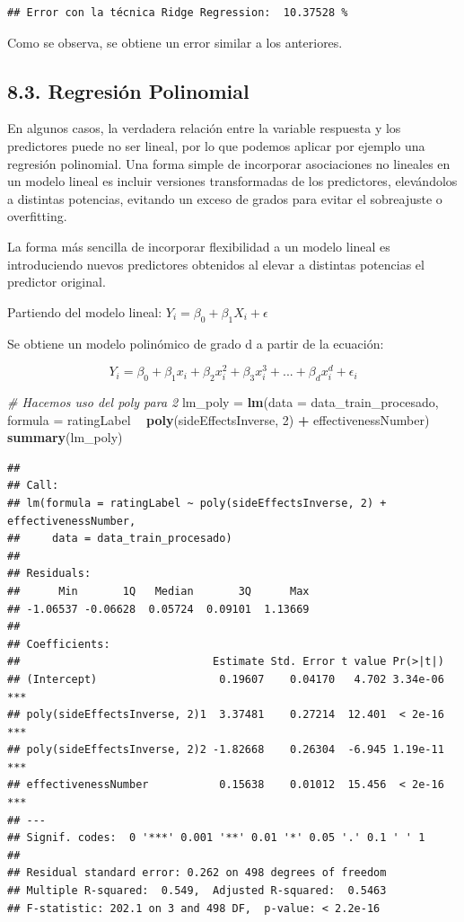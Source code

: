 \documentclass[spanish,]{article}
\newenvironment{Shaded}{\begin{snugshade}}{\end{snugshade}}
\newcommand{\KeywordTok}[1]{\textcolor[rgb]{0.13,0.29,0.53}{\textbf{#1}}}
\newcommand{\DataTypeTok}[1]{\textcolor[rgb]{0.13,0.29,0.53}{#1}}
\newcommand{\DecValTok}[1]{\textcolor[rgb]{0.00,0.00,0.81}{#1}}
\newcommand{\StringTok}[1]{\textcolor[rgb]{0.31,0.60,0.02}{#1}}
\newcommand{\CommentTok}[1]{\textcolor[rgb]{0.56,0.35,0.01}{\textit{#1}}}
\newcommand{\OperatorTok}[1]{\textcolor[rgb]{0.81,0.36,0.00}{\textbf{#1}}}
\newcommand{\NormalTok}[1]{#1}
\begin{document}
\begin{verbatim}
## Error con la técnica Ridge Regression:  10.37528 %
\end{verbatim}

Como se observa, se obtiene un error similar a los anteriores.

\subsection{8.3. Regresión Polinomial}\label{regresion-polinomial}

En algunos casos, la verdadera relación entre la variable respuesta y
los predictores puede no ser lineal, por lo que podemos aplicar por
ejemplo una regresión polinomial. Una forma simple de incorporar
asociaciones no lineales en un modelo lineal es incluir versiones
transformadas de los predictores, elevándolos a distintas potencias,
evitando un exceso de grados para evitar el sobreajuste o overfitting.

La forma más sencilla de incorporar flexibilidad a un modelo lineal es
introduciendo nuevos predictores obtenidos al elevar a distintas
potencias el predictor original.

Partiendo del modelo lineal: \(Y_i = \beta_0 + \beta_1 X_i + \epsilon\)

Se obtiene un modelo polinómico de grado d a partir de la ecuación:

\[Y_i = \beta_0 + \beta_1 x_i + \beta_2 x^2_i + \beta_3 x^3_i + ... + \beta_d x^d_i + \epsilon_i\]

\begin{Shaded}
\begin{Highlighting}[]
\CommentTok{# Hacemos uso del poly para 2}
\NormalTok{lm_poly =}\StringTok{ }\KeywordTok{lm}\NormalTok{(}\DataTypeTok{data =}\NormalTok{ data_train_procesado, }
    \DataTypeTok{formula =}\NormalTok{ ratingLabel }\OperatorTok{~}\StringTok{ }\KeywordTok{poly}\NormalTok{(sideEffectsInverse, }\DecValTok{2}\NormalTok{) }\OperatorTok{+}\StringTok{ }\NormalTok{effectivenessNumber)}
\KeywordTok{summary}\NormalTok{(lm_poly)}
\end{Highlighting}
\end{Shaded}

\begin{verbatim}
## 
## Call:
## lm(formula = ratingLabel ~ poly(sideEffectsInverse, 2) + effectivenessNumber, 
##     data = data_train_procesado)
## 
## Residuals:
##      Min       1Q   Median       3Q      Max 
## -1.06537 -0.06628  0.05724  0.09101  1.13669 
## 
## Coefficients:
##                              Estimate Std. Error t value Pr(>|t|)    
## (Intercept)                   0.19607    0.04170   4.702 3.34e-06 ***
## poly(sideEffectsInverse, 2)1  3.37481    0.27214  12.401  < 2e-16 ***
## poly(sideEffectsInverse, 2)2 -1.82668    0.26304  -6.945 1.19e-11 ***
## effectivenessNumber           0.15638    0.01012  15.456  < 2e-16 ***
## ---
## Signif. codes:  0 '***' 0.001 '**' 0.01 '*' 0.05 '.' 0.1 ' ' 1
## 
## Residual standard error: 0.262 on 498 degrees of freedom
## Multiple R-squared:  0.549,  Adjusted R-squared:  0.5463 
## F-statistic: 202.1 on 3 and 498 DF,  p-value: < 2.2e-16
\end{verbatim}
\end{document}

